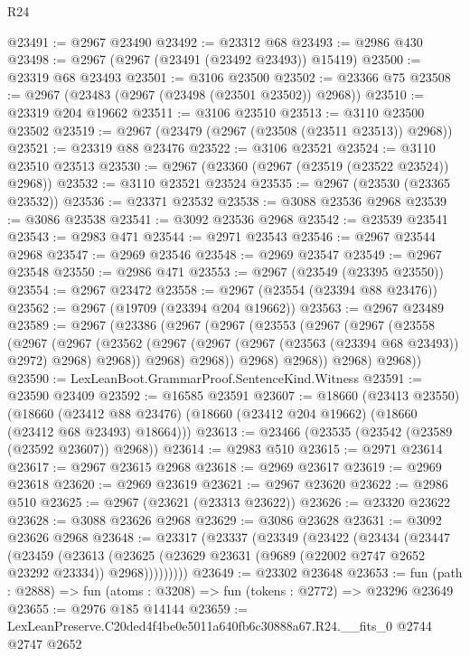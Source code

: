 \begin{lexlean}{R24}
\begin{coremodule}
@23491 := @2967 @23490
@23492 := @23312 @68
@23493 := @2986 @430
@23498 := @2967 (@2967 (@23491 (@23492 @23493)) @15419)
@23500 := @23319 @68 @23493
@23501 := @3106 @23500
@23502 := @23366 @75
@23508 := @2967 (@23483 (@2967 (@23498 (@23501 @23502)) @2968))
@23510 := @23319 @204 @19662
@23511 := @3106 @23510
@23513 := @3110 @23500 @23502
@23519 := @2967 (@23479 (@2967 (@23508 (@23511 @23513)) @2968))
@23521 := @23319 @88 @23476
@23522 := @3106 @23521
@23524 := @3110 @23510 @23513
@23530 := @2967 (@23360 (@2967 (@23519 (@23522 @23524)) @2968))
@23532 := @3110 @23521 @23524
@23535 := @2967 (@23530 (@23365 @23532))
@23536 := @23371 @23532
@23538 := @3088 @23536 @2968
@23539 := @3086 @23538
@23541 := @3092 @23536 @2968
@23542 := @23539 @23541
@23543 := @2983 @471
@23544 := @2971 @23543
@23546 := @2967 @23544 @2968
@23547 := @2969 @23546
@23548 := @2969 @23547
@23549 := @2967 @23548
@23550 := @2986 @471
@23553 := @2967 (@23549 (@23395 @23550))
@23554 := @2967 @23472
@23558 := @2967 (@23554 (@23394 @88 @23476))
@23562 := @2967 (@19709 (@23394 @204 @19662))
@23563 := @2967 @23489
@23589 := @2967
    (@23386
      (@2967
        (@2967
          (@23553
            (@2967
              (@2967
                (@23558
                  (@2967
                    (@2967
                      (@23562
                        (@2967 (@2967 (@2967 (@23563 (@23394 @68 @23493)) @2972) @2968) @2968))
                      @2968)
                    @2968))
                @2968)
              @2968))
          @2968)
        @2968))
@23590 := LexLeanBoot.GrammarProof.SentenceKind.Witness
@23591 := @23590 @23409
@23592 := @16585 @23591
@23607 := @18660
    (@23413 @23550)
    (@18660 (@23412 @88 @23476) (@18660 (@23412 @204 @19662) (@18660 (@23412 @68 @23493) @18664)))
@23613 := @23466 (@23535 (@23542 (@23589 (@23592 @23607)) @2968))
@23614 := @2983 @510
@23615 := @2971 @23614
@23617 := @2967 @23615 @2968
@23618 := @2969 @23617
@23619 := @2969 @23618
@23620 := @2969 @23619
@23621 := @2967 @23620
@23622 := @2986 @510
@23625 := @2967 (@23621 (@23313 @23622))
@23626 := @23320 @23622
@23628 := @3088 @23626 @2968
@23629 := @3086 @23628
@23631 := @3092 @23626 @2968
@23648 := @23317
    (@23337
      (@23349
        (@23422
          (@23434
            (@23447
              (@23459
                (@23613
                  (@23625 (@23629 @23631 (@9689 (@22002 @2747 @2652 @23292 @23334)) @2968)))))))))
@23649 := @23302 @23648
@23653 := fun (path : @2888) => fun (atoms : @3208) => fun (tokens : @2772) => @23296 @23649
@23655 := @2976 @185 @14144
@23659 := LexLeanPreserve.C20ded4f4be0e5011a640fb6c30888a67.R24.__fits_0 @2744 @2747 @2652

\end{coremodule}
\end{lexlean}
